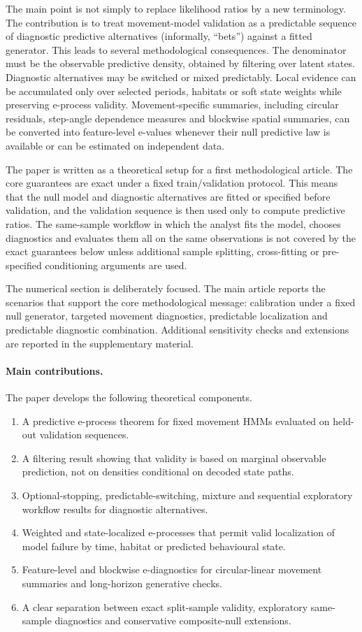 \documentclass[pdflatex,sn-basic]{sn-jnl}
\theoremstyle{thmstyleone}
\theoremstyle{thmstyletwo}
\theoremstyle{thmstylethree}
\newcommand{\1}{\mathbf 1}
\begin{document}
The main point is not simply to replace likelihood ratios by a new terminology. The contribution is to treat movement-model validation as a predictable sequence of diagnostic predictive alternatives (informally, ``bets'') against a fitted generator. This leads to several methodological consequences. The denominator must be the observable predictive density, obtained by filtering over latent states. Diagnostic alternatives may be switched or mixed predictably. Local evidence can be accumulated only over selected periods, habitats or soft state weights while preserving e-process validity. Movement-specific summaries, including circular residuals, step-angle dependence measures and blockwise spatial summaries, can be converted into feature-level e-values whenever their null predictive law is available or can be estimated on independent data.

The paper is written as a theoretical setup for a first methodological article. The core guarantees are exact under a fixed train/validation protocol. This means that the null model and diagnostic alternatives are fitted or specified before validation, and the validation sequence is then used only to compute predictive ratios. The same-sample workflow in which the analyst fits the model, chooses diagnostics and evaluates them all on the same observations is not covered by the exact guarantees below unless additional sample splitting, cross-fitting or pre-specified conditioning arguments are used.

The numerical section is deliberately focused. The main article reports the scenarios that support the core methodological message: calibration under a fixed null generator, targeted movement diagnostics, predictable localization and predictable diagnostic combination. Additional sensitivity checks and extensions are reported in the supplementary material.

\paragraph{Main contributions.}
The paper develops the following theoretical components.
\begin{enumerate}[label=(C\arabic*)]
\item A predictive e-process theorem for fixed movement HMMs evaluated on held-out validation sequences.
\item A filtering result showing that validity is based on marginal observable prediction, not on densities conditional on decoded state paths.
\item Optional-stopping, predictable-switching, mixture and sequential exploratory workflow results for diagnostic alternatives.
\item Weighted and state-localized e-processes that permit valid localization of model failure by time, habitat or predicted behavioural state.
\item Feature-level and blockwise e-diagnostics for circular-linear movement summaries and long-horizon generative checks.
\item A clear separation between exact split-sample validity, exploratory same-sample diagnostics and conservative composite-null extensions.
\end{enumerate}
\end{document}
